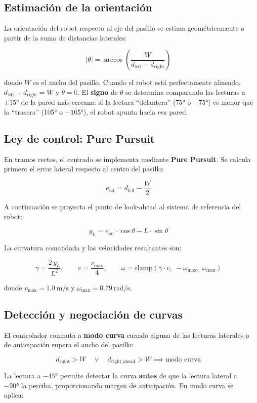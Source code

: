 \documentclass[12pt]{article}
\begin{document}
\subsection{Estimación de la orientación}
La orientación del robot respecto al eje del pasillo se estima geométricamente a partir de la suma de distancias laterales:

\[
  |\theta| = \arccos\!\left(\frac{W}{d_\text{left} + d_\text{right}}\right)
\]

donde $W$ es el ancho del pasillo. Cuando el robot está perfectamente alineado, $d_\text{left} + d_\text{right} = W$ y $\theta = 0$. El \textbf{signo} de $\theta$ se determina comparando las lecturas a $\pm 15°$ de la pared más cercana: si la lectura ``delantera'' (75° o $-75°$) es menor que la ``trasera'' (105° o $-105°$), el robot apunta hacia esa pared.

\subsection{Ley de control: Pure Pursuit}
En tramos rectos, el centrado se implementa mediante \textbf{Pure Pursuit}. Se calcula primero el error lateral respecto al centro del pasillo:

\[
  e_\text{lat} = d_\text{left} - \frac{W}{2}
\]

A continuación se proyecta el punto de look-ahead al sistema de referencia del robot:

\[
  y_L = e_\text{lat} \cdot \cos\theta - L \cdot \sin\theta
\]

La curvatura comandada y las velocidades resultantes son:

\[
  \gamma = \frac{2\,y_L}{L^2}, \qquad
  v = \frac{v_\text{max}}{4}, \qquad
  \omega = \text{clamp}\!\left(\gamma \cdot v,\; -\omega_\text{max},\; \omega_\text{max}\right)
\]

donde $v_\text{max} = \SI{1.0}{\meter\per\second}$ y $\omega_\text{max} = \SI{0.79}{\radian\per\second}$.

\subsection{Detección y negociación de curvas}
El controlador conmuta a \textbf{modo curva} cuando alguna de las lecturas laterales o de anticipación supera el ancho del pasillo:

\[
  d_\text{right} > W \quad \lor \quad d_\text{right\_ahead} > W \implies \text{modo curva}
\]

La lectura a $-45°$ permite detectar la curva \textbf{antes} de que la lectura lateral a $-90°$ la perciba, proporcionando margen de anticipación. En modo curva se aplica:
\end{document}
